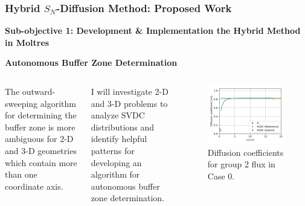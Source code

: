 \begin{frame}
  \frametitle{Hybrid $S_N$-Diffusion Method: Proposed Work}
  \textbf{Sub-objective 1: Development \& Implementation the Hybrid Method in Moltres}
  \vspace{.2cm}

  \textbf{Autonomous Buffer Zone Determination}
  \vspace{.1cm}

  \begin{columns}
    The outward-sweeping algorithm for determining the buffer zone is more ambiguous for 2-D and
    3-D geometries which contain more than one coordinate axis.
    \vspace{.2cm}

    I will investigate 2-D and 3-D problems to analyze \gls{SVDC} distributions and identify
    helpful patterns for developing an algorithm for autonomous buffer zone determination.
    \begin{figure}
      \centering
      \includegraphics[width=\textwidth]{../images/case-0-group-2-hybrid-diffcoef}
      \caption{Diffusion coefficients for group 2 flux in Case 0.}
    \end{figure}
  \end{columns}
\end{frame}

